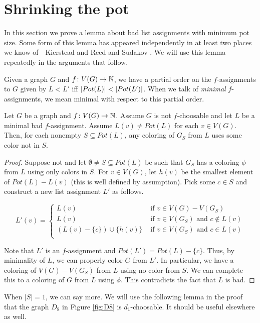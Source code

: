 \section{Shrinking the pot}
In this section we prove a lemma about bad list assignments with minimum pot size.  
Some form of this lemma has appeared independently in at least two places we know of---Kierstead \cite{kierstead2000choosability} and Reed and Sudakov \cite{ReedSudakov}.  
We will use this lemma repeatedly in the arguments that follow.

Given a graph $G$ and $f\colon V(G) \rightarrow \mathbb{N}$, we have a partial order on the $f$-assignments to $G$ given by $L < L'$ iff $\left|Pot(L)\right| < \left|Pot(L')\right|$.  When we talk of \emph{minimal} $f$-assignments, we mean minimal with respect to this partial order.

\begin{lem}\label{CannotColorSelfWithSelf}
Let $G$ be a graph and $f\colon V(G) \rightarrow \mathbb{N}$.  Assume $G$ is not $f$-choosable and let $L$ be a minimal bad $f$-assignment. Assume $L(v) \neq Pot(L)$ for each $v \in V(G)$.  Then, for each nonempty $S \subseteq Pot(L)$, any coloring of $G_S$ from $L$ uses some color not in $S$.
\end{lem}
\begin{proof}
Suppose not and let $\emptyset \neq S \subseteq Pot(L)$ be such that $G_S$ has a coloring $\phi$ from $L$ using only colors in $S$.  For $v \in V(G)$, let $h(v)$ be the smallest element of $Pot(L) - L(v)$ (this is well defined by assumption). Pick some $c \in S$ and construct a new list assignment $L'$ as follows.

\[L'(v) = \left \{ \begin{array}{rl}
L(v) &\mbox{ if $v \in V(G) - V(G_S)$} \\
L(v) &\mbox{ if $v \in V(G_S)$ and $c \not \in L(v)$} \\
\left(L(v) - \{c\}\right) \cup \{h(v)\} &\mbox{ if $v \in V(G_S)$ and $c\in L(v)$} \\
\end{array} \right.\]

Note that $L'$ is an $f$-assignment and $Pot(L') = Pot(L) - \{c\}$.  Thus, by minimality of $L$, we can properly color $G$ from $L'$.  In particular, we have a coloring of $V(G) - V(G_S)$ from $L$ using no color from $S$.  We can complete this to a coloring of $G$ from $L$ using $\phi$. This contradicts the fact that $L$ is bad.  
\end{proof}

When $|S| = 1$, we can say more.  We will use the following lemma in the proof
that the graph $D_8$ in Figure \ref{fig:D8} is $d_1$-choosable.  It should be
useful elsewhere as well.

